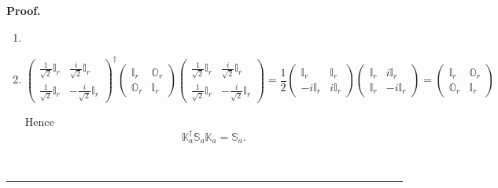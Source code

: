 \documentclass[aps, preprint]{revtex4}
\newenvironment{proof}[1][Proof]{\noindent\textbf{#1.} }{\ \rule{0.5em}{0.5em}}
\begin{document}
\begin{proof}
\begin{enumerate}
\item 

\item
\begin{equation}\left (\begin{array}{cc}\frac{1}{\sqrt{2}} \mathbb{I}_{r} & \frac{i}{\sqrt{2}} \mathbb{I}_{r} \\
\frac{1}{\sqrt{2}} \mathbb{I}_{r} &  -\frac{i}{\sqrt{2}} \mathbb{I}_{r}\end{array}\right )^{ \dag } \left (\begin{array}{cc}\mathbb{I}_{r} & \mathbb{O}_{r} \\
\mathbb{O}_{r} & \mathbb{I}_{r}\end{array}\right ) \left (\begin{array}{cc}\frac{1}{\sqrt{2}} \mathbb{I}_{r} & \frac{i}{\sqrt{2}} \mathbb{I}_{r} \\
\frac{1}{\sqrt{2}} \mathbb{I}_{r} &  -\frac{i}{\sqrt{2}} \mathbb{I}_{r}\end{array}\right ) =\frac{1}{2} \left (\begin{array}{cc}\mathbb{I}_{r} & \mathbb{I}_{r} \\
 -i \mathbb{I}_{r} & i \mathbb{I}_{r}\end{array}\right ) \left (\begin{array}{cc}\mathbb{I}_{r} & i \mathbb{I}_{r} \\
\mathbb{I}_{r} &  -i \mathbb{I}_{r}\end{array}\right ) =\left (\begin{array}{cc}\mathbb{I}_{r} & \mathbb{O}_{r} \\
\mathbb{O}_{r} & \mathbb{I}_{r}\end{array}\right )
\end{equation}

Hence
\begin{equation}\mathbb{K}_{a}^{ \dag } \mathbb{S}_{a} \mathbb{K}_{a} =\mathbb{S}_{a}\text{.}
\end{equation}


\end{enumerate}
\end{proof}
\end{document}
